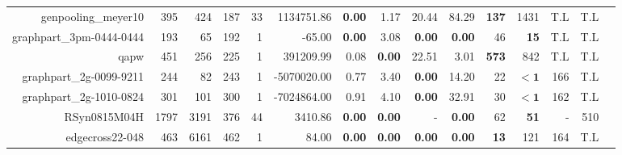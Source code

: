 \begin{table*}[t]
\begin{tabular}{|r|r|r|r|r||r||r|r|r|r||r|r|r|r|r|}
              genpooling\_meyer10 &          395 &          424 &         187 &           33 &          1134751.86 &  \textbf{0.00} &          1.17 &          20.44 &         84.29 & \textbf{137} &               1431 &          T.L &          T.L \\ 
         graphpart\_3pm-0444-0444 &          193 &           65 &         192 &            1 &              -65.00 &  \textbf{0.00} &          3.08 &  \textbf{0.00} & \textbf{0.00} &           46 &        \textbf{15} &          T.L &          T.L \\ 
                             qapw &          451 &          256 &         225 &            1 &           391209.99 &           0.08 & \textbf{0.00} &          22.51 &          3.01 & \textbf{573} &                842 &          T.L &          T.L \\ 
          graphpart\_2g-0099-9211 &          244 &           82 &         243 &            1 &         -5070020.00 &           0.77 &          3.40 &  \textbf{0.00} &         14.20 &           22 &         $\bm{< 1}$ &          166 &          T.L \\ 
          graphpart\_2g-1010-0824 &          301 &          101 &         300 &            1 &         -7024864.00 &           0.91 &          4.10 &  \textbf{0.00} &         32.91 &           30 &         $\bm{< 1}$ &          162 &          T.L \\ 
                     RSyn0815M04H &         1797 &         3191 &         376 &           44 &             3410.86 &  \textbf{0.00} & \textbf{0.00} &              - & \textbf{0.00} &           62 &        \textbf{51} &            - &          510 \\ 
                  edgecross22-048 &          463 &         6161 &         462 &            1 &               84.00 &  \textbf{0.00} & \textbf{0.00} &  \textbf{0.00} & \textbf{0.00} &  \textbf{13} &                121 &          164 &          T.L \\ 
\hline 
\end{tabular}\\ 
\label{table:results} 
\end{table*} 
